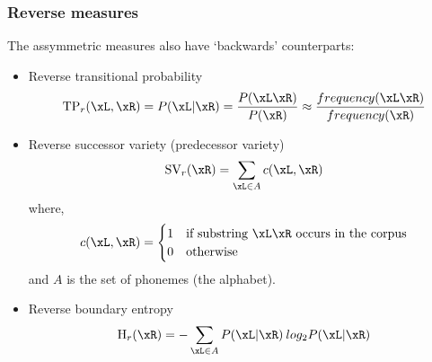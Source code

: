 
\begin{frame}
\frametitle{Reverse measures}
The assymmetric measures also have `backwards' counterparts:

\begin{itemize}
\item Reverse transitional probability
\begin{equation}\label{eq:seg-tp-rev}
    \textrm{TP}_r(\xL,\xR) = P(\xL|\xR) 
                   = \frac{P(\xL\xR)}{P(\xR)} 
             \approx \frac{frequency(\xL\xR)}{frequency(\xR)}
\end{equation}

\item Reverse successor variety (predecessor variety)
\begin{equation}\label{eq:seg-sv-rev}
\textrm{SV}_r(\xR) = \sum_{\xL\in A} c(\xL,\xR)
\end{equation}
where,
\begin{equation*}
c(\xL,\xR)=\begin{cases}%
1 & \text{if substring $\xL\xR$ occurs in the corpus}\\
0 & \text{otherwise}\\
\end{cases}
\end{equation*}
and $A$ is the set of phonemes (the alphabet).

\item Reverse boundary entropy
\begin{equation}\label{eq:seg-ent-rev}
    \textrm{H}_r(\xR) = -\sum_{\xL\in A}
          P(\xL|\xR) \: log_2 P(\xL|\xR)
\end{equation}
\end{itemize}


\end{frame}
